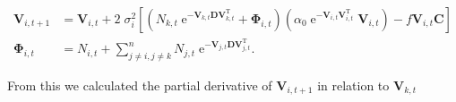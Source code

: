 \begin{equation*}
\begin{split}
    \mathbf{V}_{i,t+1} &= \mathbf{V}_{i,t} + 2 \; \sigma_i^2
    \left[
        \left(
            N_{k,t} \; \textrm{e}^{-\mathbf{V}_{k,t} \mathbf{D} \mathbf{V}_{k,t}^\textrm{T}} +
            \mathbf{\Phi}_{i,t}
        \right)
        \left(
            \alpha_0 \; \textrm{e}^{-\mathbf{V}_{i,t}
            \mathbf{V}_{i,t}^\textrm{T}} \; \mathbf{V}_{i,t}
        \right)
        - f \mathbf{V}_{i,t} \mathbf{C}
    \right] \\
    \mathbf{\Phi}_{i,t} &= N_{i,t} + \sum_{j \ne i, j \ne k}^{n}{
        N_{j,t} \; \textrm{e}^{- \mathbf{V}_{j,t} \mathbf{D}
        \mathbf{V}_{j,t}^{\textrm{T}}} }
    \textrm{.}
\end{split}
\end{equation*}

From this we calculated the partial derivative of $\mathbf{V}_{i,t+1}$ in relation to
$\mathbf{V}_{k,t}$


